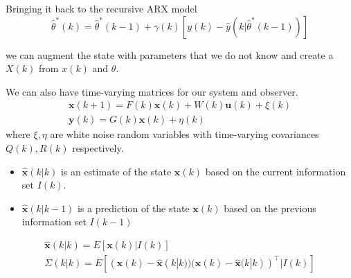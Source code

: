 \documentclass[11pt]{article}
\begin{document}
Bringing it back to the recursive ARX model
\begin{equation}
    \hat{\theta}^*(k) = \hat{\theta}^* (k-1) + \gamma (k) [y(k) - \hat{y} (k | \hat{\theta}^* (k-1))]
\end{equation}

we can augment the state with parameters that we do not know and create a $X(k)$ from $x(k)$ and $\theta$.

We can also have time-varying matrices for our system and observer.
\begin{gather}
    \textbf{x}(k+1) = F(k) \textbf{x}(k) + W(k) \textbf{u}(k) + \xi(k) \\
    \textbf{y}(k) = G(k) \textbf{x}(k) + \eta(k)
\end{gather}
where $\xi, \eta$ are white noise random variables with time-varying covariances $Q(k), R(k)$ respectively.

\begin{itemize}
    \item $\hat{\textbf{x}}(k | k)$ is an estimate of the state $\textbf{x}(k)$ based on the current information set $I(k)$.
    \item $\hat{\textbf{x}}(k | k - 1)$ is a prediction of the state $\textbf{x}(k)$ based on the previous information set $I(k-1)$
\end{itemize}

\begin{gather}
    \hat{\textbf{x}} (k | k) = E[\textbf{x} (k) | I(k)] \\
    \Sigma(k | k) = E[ (\textbf{x}(k) - \hat{\textbf{x}}(k | k))(\textbf{x}(k) - \hat{\textbf{x}}(k | k))^\top | I(k)]
\end{gather}




\end{document}
